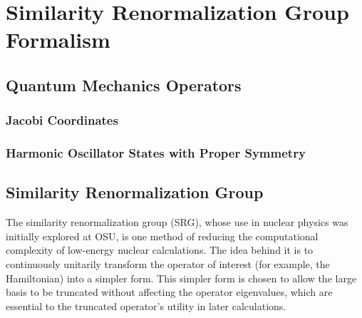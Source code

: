 \chapter{Similarity Renormalization Group Formalism}

\section{Quantum Mechanics Operators}

\subsection{Jacobi Coordinates}

\subsection{Harmonic Oscillator States with Proper Symmetry}

\section{Similarity Renormalization Group}

The similarity renormalization group (SRG), whose use in nuclear physics was initially explored at OSU, is one method of reducing the computational complexity of low-energy nuclear calculations. The idea behind it is to continuously unitarily transform the operator of interest (for example, the Hamiltonian) into a simpler form. This simpler form is chosen to allow the large basis to be truncated without affecting the operator eigenvalues, which are essential to the truncated operator's utility in later calculations.